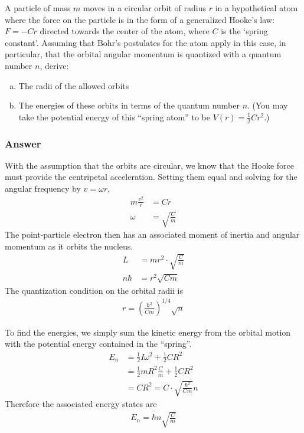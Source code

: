 A particle of mass $m$ moves in a circular orbit of radius $r$ in a 
hypothetical atom where the force on the particle is in the form of a 
generalized Hooke's law: $F = -Cr$ directed towards the center of the atom, 
where $C$ is the `spring constant'. Assuming that Bohr's postulates for the 
atom apply in this case, in particular, that the orbital angular momentum 
is quantized with a quantum number $n$, derive:
\begin{enumerate}[(a)]
	\item The radii of the allowed orbits
	\item The energies of these orbits in terms of the quantum number $n$. (You may take the potential energy of this ``spring atom'' to be $V(r) = \frac 12 Cr^2$.)
\end{enumerate}

\subsubsection{Answer}

With the assumption that the orbits are circular, we know that the Hooke 
force must provide the centripetal acceleration. Setting them equal and 
solving for the angular frequency by $v = {\omega}r$,
\begin{align*}
	m \frac{v^2}{r} &= Cr \\
	{\omega} &= \sqrt{\frac{C}{m}}
\end{align*}
The point-particle electron then has an associated moment of inertia and 
angular momentum as it orbits the nucleus.
\begin{align*}
	L &= mr^2 \cdot  \sqrt{\frac{C}{m}} \\
	n{\hbar} &= r^2 \sqrt{Cm}
\end{align*}
The quantization condition on the orbital radii is
\begin{align}
	\boxed{ r = (\frac{{\hbar}^2}{Cm})^{1/4} \sqrt{n} }
\end{align}

To find the energies, we simply sum the kinetic energy from the orbital 
motion with the potential energy contained in the ``spring''.
\begin{align*}
	E_n &= \frac 12 I {\omega}^2 + \frac 12 C R^2 \\
	&= \frac 12 m R^2 \frac{C}{m} + \frac 12 C R^2 \\
	&= C R^2 = C \cdot  \sqrt{\frac{{\hbar}^2}{Cm}} n
\end{align*}
Therefore the associated energy states are
\begin{align}
	\boxed{ E_n = {\hbar}n\sqrt{\frac{C}{m}} }
\end{align}




